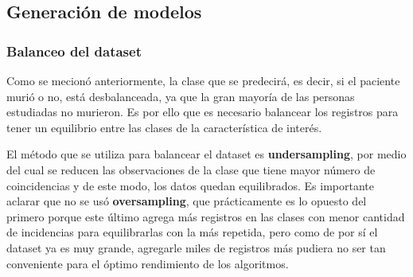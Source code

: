 \documentclass[]{article}
\newenvironment{Shaded}{\begin{snugshade}}{\end{snugshade}}
\newcommand{\KeywordTok}[1]{\textcolor[rgb]{0.13,0.29,0.53}{\textbf{#1}}}
\newcommand{\NormalTok}[1]{#1}
\newcommand{\OperatorTok}[1]{\textcolor[rgb]{0.81,0.36,0.00}{\textbf{#1}}}
\newcommand{\StringTok}[1]{\textcolor[rgb]{0.31,0.60,0.02}{#1}}
\begin{document}
\hypertarget{generaciuxf3n-de-modelos}{%
\subsection{Generación de modelos}\label{generaciuxf3n-de-modelos}}

\hypertarget{balanceo-del-dataset}{%
\subsubsection{Balanceo del dataset}\label{balanceo-del-dataset}}

Como se mecionó anteriormente, la clase que se predecirá, es decir, si
el paciente murió o no, está desbalanceada, ya que la gran mayoría de
las personas estudiadas no murieron. Es por ello que es necesario
balancear los registros para tener un equilibrio entre las clases de la
característica de interés.

El método que se utiliza para balancear el dataset es
\textbf{undersampling}, por medio del cual se reducen las observaciones
de la clase que tiene mayor número de coincidencias y de este modo, los
datos quedan equilibrados. Es importante aclarar que no se usó
\textbf{oversampling}, que prácticamente es lo opuesto del primero
porque este último agrega más registros en las clases con menor cantidad
de incidencias para equilibrarlas con la más repetida, pero como de por
sí el dataset ya es muy grande, agregarle miles de registros más pudiera
no ser tan conveniente para el óptimo rendimiento de los algoritmos.

\begin{Shaded}
\end{Shaded}

\begin{Shaded}
\end{Shaded}
\end{document}

